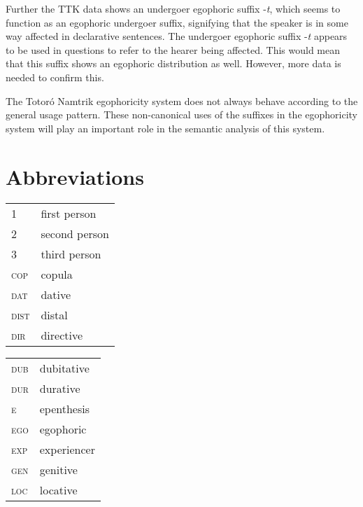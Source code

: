 \documentclass[output=paper]{langsci/langscibook}
\begin{document}
Further the TTK data shows an undergoer egophoric suffix -\textit{t}, which seems to function as an egophoric undergoer suffix, signifying that the speaker is in some way affected in declarative sentences. The undergoer egophoric suffix -\textit{t} appears to be used in questions to refer to the hearer being affected. This would mean that this suffix shows an egophoric distribution as well. However, more data is needed to confirm this.

The Totoró Namtrik egophoricity system does not always behave according to the general usage pattern. These non-canonical uses of the suffixes in the egophoricity system will play an important role in the semantic analysis of this system.


  
\section*{Abbreviations}
\begin{tabularx}{.45\textwidth}{lQ}
1 & first person\\
2 & second person\\ 
3 & third person\\ 
\textsc{cop} & copula\\ 
\textsc{dat} & dative\\ 
\textsc{dist} & distal\\ 
\textsc{dir} & directive\\
\end{tabularx}
\begin{tabularx}{.45\textwidth}{lQ}
\textsc{dub} & dubitative\\
\textsc{dur} & durative\\
\textsc{e} & epenthesis\\
\textsc{ego} & egophoric\\
\textsc{exp} & experiencer\\
\textsc{gen} & genitive\\
\textsc{loc} & locative\\
\end{tabularx}
\end{document}
